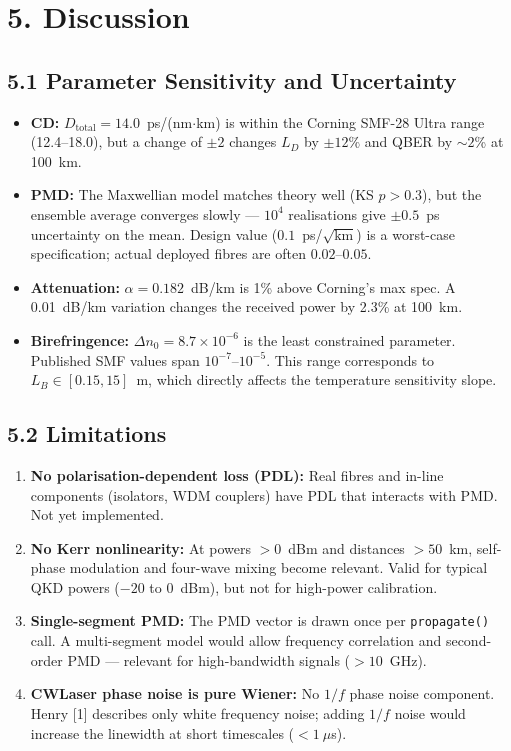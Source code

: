 \documentclass[11pt,a4paper]{article}
\begin{document}
\section{5. Discussion}
\label{sec:discussion}

\subsection{5.1 Parameter Sensitivity and Uncertainty}
\begin{itemize}[nosep]
  \item \textbf{CD:} $D_{\text{total}} = 14.0$~ps/(nm$\cdot$km) is within
    the Corning SMF-28 Ultra range (12.4--18.0), but a change of
    $\pm 2$ changes $L_D$ by $\pm 12\%$ and QBER by $\sim 2$\% at 100~km.
  \item \textbf{PMD:} The Maxwellian model matches theory well (KS $p >
    0.3$), but the ensemble average converges slowly --- $10^4$
    realisations give $\pm 0.5$~ps uncertainty on the mean.
    Design value ($0.1$~ps/$\sqrt{\text{km}}$) is a worst-case
    specification; actual deployed fibres are often $0.02$--$0.05$.
  \item \textbf{Attenuation:} $\alpha = 0.182$~dB/km is 1\% above
    Corning's max spec.  A 0.01~dB/km variation changes the received
    power by 2.3\% at 100~km.
  \item \textbf{Birefringence:} $\Delta n_0 = 8.7\times10^{-6}$ is the
    least constrained parameter.  Published SMF values span
    $10^{-7}$--$10^{-5}$.  This range corresponds to
    $L_B \in [0.15, 15]$~m, which directly affects the temperature
    sensitivity slope.
\end{itemize}

\subsection{5.2 Limitations}
\begin{enumerate}[nosep]
  \item \textbf{No polarisation-dependent loss (PDL):} Real fibres and
    in-line components (isolators, WDM couplers) have PDL that interacts
    with PMD.  Not yet implemented.
  \item \textbf{No Kerr nonlinearity:} At powers $>0$~dBm and
    distances $>50$~km, self-phase modulation and four-wave mixing
    become relevant.  Valid for typical QKD powers ($-20$ to
    $0$~dBm), but not for high-power calibration.
  \item \textbf{Single-segment PMD:} The PMD vector is drawn once per
    \texttt{propagate()} call.  A multi-segment model would allow frequency
    correlation and second-order PMD --- relevant for high-bandwidth
    signals ($>10$~GHz).
  \item \textbf{CWLaser phase noise is pure Wiener:} No $1/f$ phase noise
    component.  Henry [1] describes only white frequency noise; adding
    $1/f$ noise would increase the linewidth at short timescales
    ($<1~\mu$s).
\end{enumerate}
\end{document}
